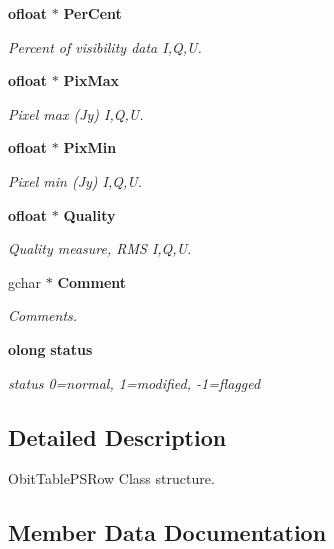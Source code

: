 \begin{CompactItemize}
{\bf ofloat} $\ast$ {\bf Per\-Cent}
\begin{CompactList}\small\item\em Percent of visibility data I,Q,U. \item\end{CompactList}\item 
{\bf ofloat} $\ast$ {\bf Pix\-Max}
\begin{CompactList}\small\item\em Pixel max (Jy) I,Q,U. \item\end{CompactList}\item 
{\bf ofloat} $\ast$ {\bf Pix\-Min}
\begin{CompactList}\small\item\em Pixel min (Jy) I,Q,U. \item\end{CompactList}\item 
{\bf ofloat} $\ast$ {\bf Quality}
\begin{CompactList}\small\item\em Quality measure, RMS I,Q,U. \item\end{CompactList}\item 
gchar $\ast$ {\bf Comment}
\begin{CompactList}\small\item\em Comments. \item\end{CompactList}\item 
{\bf olong} {\bf status}
\begin{CompactList}\small\item\em status 0=normal, 1=modified, -1=flagged \item\end{CompactList}\end{CompactItemize}


\subsection{Detailed Description}
Obit\-Table\-PSRow Class structure. 



\subsection{Member Data Documentation}

